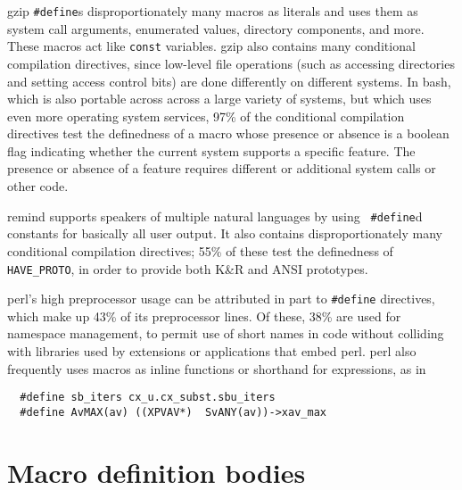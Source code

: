 \documentclass[10pt]{article}
\newcommand{\pkg}[1]{\textsf{#1}}
\begin{document}
\pkg{gzip} {\tt \#define}s disproportionately many macros as literals and
uses them as system call arguments, enumerated values, directory
components, and more.  These macros act like {\tt const} variables.
\pkg{gzip} also contains many conditional compilation directives, since
low-level file operations (such as accessing directories and setting access
control bits) are done differently on different systems.  In \pkg{bash},
which is also portable across across a large variety of systems, but which
uses even more operating system services, 97\% of the conditional
compilation directives test the definedness of a macro whose presence or
absence is a boolean flag indicating whether the current system supports a
specific feature.  The presence or absence of a feature requires different
or additional system calls or other code.


\pkg{remind} supports speakers of multiple natural languages by using {\tt
\#define}d constants for basically all user output.  It also contains
disproportionately many conditional compilation directives; 55\% of
these test the definedness of \verb|HAVE_PROTO|, in order to provide both
K\&R and ANSI prototypes.


\pkg{perl}'s high preprocessor usage can be attributed in part to {\tt \#define}
directives, which make up 43\% of its preprocessor lines.  Of these, 38\%
are used for namespace management, to permit use of short names in code
without colliding with libraries used by extensions or applications that
embed \pkg{perl}.  \pkg{perl} also frequently uses macros as inline
functions or shorthand for expressions, as in
\begin{verbatim}
  #define sb_iters cx_u.cx_subst.sbu_iters
  #define AvMAX(av) ((XPVAV*)  SvANY(av))->xav_max
\end{verbatim}


\section{Macro definition bodies}
\label{sec:macro-bodies}

\end{document}
